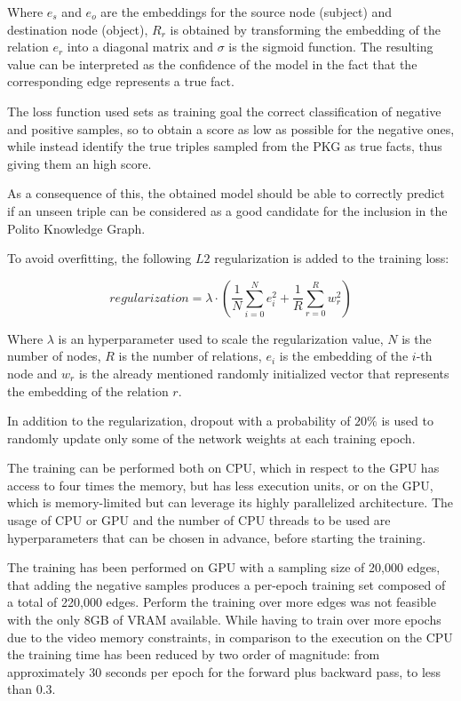 \documentclass[%
    corpo=13.5pt,
    twoside,
    oldstyle,
    tipotesi=magistrale,
    greek,
    evenboxes
]{toptesi}
\begin{document}
Where $e_s$ and $e_o$ are the embeddings for the source node (subject) and
destination node (object), $R_r$ is obtained by transforming the embedding
of the relation $e_r$ into a diagonal matrix and $\sigma$ is the
sigmoid function.
The resulting value can be interpreted as the confidence of the model in
the fact that the corresponding edge represents a true fact.

The loss function used sets as training goal the correct classification of
negative and positive samples, so to obtain a score as low as possible for the
negative ones, while instead identify the true triples sampled from the PKG as
true facts, thus giving them an high score.

As a consequence of this, the obtained model should be able to correctly
predict if an unseen triple can be considered as a good candidate for the
inclusion in the Polito Knowledge Graph.

To avoid overfitting, the following $L2$ regularization is added to the
training loss:

\begin{equation}
    regularization = \lambda \cdot \left(\frac{1}{N}\sum_{i=0}^{N} e_{i}^2 + \frac{1}{R}\sum_{r=0}^{R} w_{r}^2 \right)
\end{equation}

Where $\lambda$ is an hyperparameter used to scale the regularization value, $N$
is the number of nodes, $R$ is the number of relations, $e_i$ is the embedding
of the $i$-th node and $w_r$ is the already mentioned randomly initialized
vector that represents the embedding of the relation $r$.

In addition to the regularization, dropout with a probability of $20\%$ is used
to randomly update only some of the network weights at each training epoch.

The training can be performed both on CPU, which in respect to the GPU has
access to four times the memory, but has less execution units, or on the GPU,
which is memory-limited but can leverage its highly parallelized architecture.
The usage of CPU or GPU and the number of CPU threads to be used are
hyperparameters that can be chosen in advance, before starting the training.

The training has been performed on GPU with a sampling size of 20,000
edges, that adding the negative samples produces a per-epoch training set
composed of a total of 220,000 edges.
Perform the training over more edges was not feasible with the only 8GB of VRAM
available.
While having to train over more epochs due to the video memory constraints, in
comparison to the execution on the CPU the training time has been reduced by two
order of magnitude: from approximately 30 seconds per epoch for the forward
plus backward pass, to less than 0.3.
\end{document}
